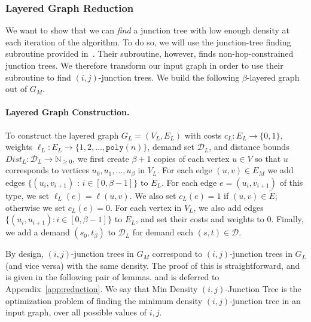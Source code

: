 \documentclass{article}
\theoremstyle{definition}
\theoremstyle{remark}
\def\jt {{\sc Min Density $(i,j)$-Junction Tree}}
\begin{document}
\subsubsection{Layered Graph Reduction} \label{sec:layered_reduction}
We want to show that we can \textit{find} a junction tree with low enough density at each iteration of the algorithm. To do so, we will use the junction-tree finding subroutine provided in~\cite{GKL23}. Their subroutine, however, finds non-hop-constrained junction trees. We therefore transform our input graph in order to use their subroutine to find $(i,j)$-junction trees. We build the following $\beta$-layered graph out of $G_M$. 

\paragraph{Layered Graph Construction.} To construct the layered graph $G_L = (V_L, E_L)$ with costs $c_L : E_L \rightarrow \{0,1\}$, weights $\ell_L : E_L \rightarrow \{1, 2, \dots, \texttt{poly}(n) \}$, demand set $\mathcal{D}_L$, and distance bounds $Dist_L : \mathcal{D}_L \rightarrow \mathbb{N}_{\geq 0}$, 
we first create $\beta + 1$ copies of each vertex $u \in V$ so that $u$ corresponds to vertices $u_0, u_1, \dots, u_{\beta}$ in $V_L$.
For each edge $(u,v) \in E_M$ we add edges $\{ (u_i, v_{i+1})$ : $i \in [0, \beta-1] \}$ to $E_L$. 
For each edge $e = (u_i, v_{i+1})$ of this type, we set $\ell_{L}(e) = \ell(u,v)$. We also set $c_{L}(e) = 1$ if $(u,v) \in \widetilde{E}$; otherwise we set $c_{L}(e) = 0$.  
For each vertex in $V_L$, we also add edges $\{ (u_i, u_{i+1}) : i \in [0, \beta-1]  \}$ to $E_L$, and set their costs and weights to $0$. 
Finally, we add a demand $(s_0, t_\beta)$ to $\mathcal{D}_L$ for demand each $(s,t) \in \mathcal{D}$.


By design, $(i,j)$-junction trees in $G_M$ correspond to $(i,j)$-junction trees in $G_L$ (and vice versa) with the same density. The proof of this is straightforward, \iflong and is given in the following pair of lemmas. \else and is deferred to Appendix~\ref{app:reduction}. We say that {\jt} is the optimization problem of finding the minimum density $(i,j)$-junction tree in an input graph, over all possible values of $i,j$. \fi
\end{document}
